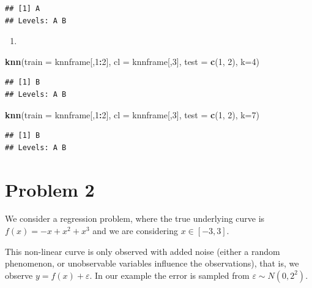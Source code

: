 \documentclass[]{article}
\newenvironment{Shaded}{\begin{snugshade}}{\end{snugshade}}
\newcommand{\KeywordTok}[1]{\textcolor[rgb]{0.13,0.29,0.53}{\textbf{#1}}}
\newcommand{\DataTypeTok}[1]{\textcolor[rgb]{0.13,0.29,0.53}{#1}}
\newcommand{\DecValTok}[1]{\textcolor[rgb]{0.00,0.00,0.81}{#1}}
\newcommand{\OperatorTok}[1]{\textcolor[rgb]{0.81,0.36,0.00}{\textbf{#1}}}
\newcommand{\NormalTok}[1]{#1}
\begin{document}
\begin{verbatim}
## [1] A
## Levels: A B
\end{verbatim}

\begin{enumerate}
\def\labelenumi{\alph{enumi}.}
\setcounter{enumi}{6}
\item
\end{enumerate}

\begin{Shaded}
\begin{Highlighting}[]
\KeywordTok{knn}\NormalTok{(}\DataTypeTok{train =}\NormalTok{ knnframe[,}\DecValTok{1}\OperatorTok{:}\DecValTok{2}\NormalTok{], }\DataTypeTok{cl =}\NormalTok{ knnframe[,}\DecValTok{3}\NormalTok{], }\DataTypeTok{test =} \KeywordTok{c}\NormalTok{(}\DecValTok{1}\NormalTok{, }\DecValTok{2}\NormalTok{), }\DataTypeTok{k=}\DecValTok{4}\NormalTok{)}
\end{Highlighting}
\end{Shaded}

\begin{verbatim}
## [1] B
## Levels: A B
\end{verbatim}

\begin{Shaded}
\begin{Highlighting}[]
\KeywordTok{knn}\NormalTok{(}\DataTypeTok{train =}\NormalTok{ knnframe[,}\DecValTok{1}\OperatorTok{:}\DecValTok{2}\NormalTok{], }\DataTypeTok{cl =}\NormalTok{ knnframe[,}\DecValTok{3}\NormalTok{], }\DataTypeTok{test =} \KeywordTok{c}\NormalTok{(}\DecValTok{1}\NormalTok{, }\DecValTok{2}\NormalTok{), }\DataTypeTok{k=}\DecValTok{7}\NormalTok{)}
\end{Highlighting}
\end{Shaded}

\begin{verbatim}
## [1] B
## Levels: A B
\end{verbatim}

\section{Problem 2}\label{problem-2}

We consider a regression problem, where the true underlying curve is
\(f(x)=-x+x^2+x^3\) and we are considering \(x \in [-3,3]\).

This non-linear curve is only observed with added noise (either a random
phenomenon, or unobservable variables influence the observations), that
is, we observe \(y=f(x)+\varepsilon\). In our example the error is
sampled from \(\varepsilon\sim N(0,2^2)\).
\end{document}
